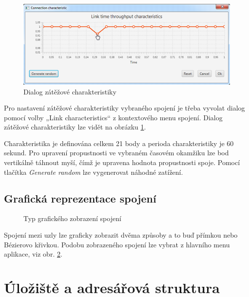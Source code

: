 \documentclass[czech,DP]{thesiskiv}
\begin{document}
\begin{figure}[H]
\centering
	\includegraphics{img/prirucka/spojeni_charakteristika_dialog.png}
\caption{Dialog zátěžové charakteristiky}
\label{fig:p_spojeni_charakteristika_dialog}
\end{figure}

Pro nastavení zátěžové charakteristiky vybraného spojení je třeba vyvolat dialog pomocí volby „Link characteristics“ z kontextového menu spojení. Dialog zátěžové charakteristiky lze vidět na obrázku \ref{fig:p_spojeni_charakteristika_dialog}. 

Charakteristika je definována celkem 21 body a perioda charakteristiky je 60 sekund. Pro upravení propustnosti ve vybraném časovém okamžiku lze bod vertikálně táhnout myší, čímž je upravena hodnota propustnosti spoje. Pomocí tlačítka \textit{Generate random} lze vygenerovat náhodné zatížení.

\subsection{Grafická reprezentace spojení}

\begin{figure}
\centering
\caption{Typ grafického zobrazení spojení}
\label{fig:p_menu_typ_spojeni}
\end{figure}

Spojení mezi uzly lze graficky zobrazit dvěma způsoby a to buď přímkou nebo Bézierovo křivkou. Podobu zobrazeného spojení lze vybrat z hlavního menu aplikace, viz obr. \ref{fig:p_menu_typ_spojeni}.

\section{Úložiště a adresářová struktura}
\end{document}
